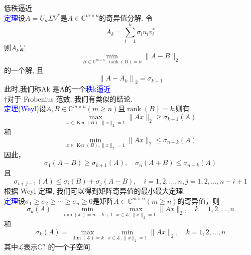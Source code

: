 \documentclass[12pt,a4paper]{article}
\begin{document}
低秩逼近\\

\textcolor{blue}{定理}设$A=U_{n} \Sigma V^{*}$是$A \in \mathbb{C}^{m \times n}$的奇异值分解. 令
$$
A_{k}=\sum_{i=1}^{k} \sigma_{i} u_{i} v_{i}^{*}
$$
则$A_{k}$是
\begin{equation}
\min _{B \in \mathbb{C}^{m \times n}, \operatorname{rank}(B)=k}\|A-B\|_{2}
\end{equation}
的一个解, 且
$$
\left\|A-A_{k}\right\|_{2}=\sigma_{k+1}
$$
此时,我们称Ak 是A的一个\textcolor{blue}{秩k逼近}\\
$\dagger$对于 Frobenius 范数, 我们有类似的结论.\\

\textcolor{blue}{定理(Weyl)}设$A, B \in \mathbb{C}^{m \times n}(m \geq n)$且$\operatorname{rank}(B)=k$,则有
\begin{equation}
\max _{x \in \operatorname{Ker}(B),\|x\|_{2}=1}\|A x\|_{2} \geq \sigma_{k+1}(A)
\end{equation}
和
\begin{equation}
\min _{x \in \operatorname{Ker}(B),\|x\|_{2}=1}\|A x\|_{2} \leq \sigma_{n-k}(A)
\end{equation}
因此，
\begin{equation}
\sigma_{1}(A-B) \geq \sigma_{k+1}(A), \quad \sigma_{n}(A+B) \leq \sigma_{n-k}(A)
\end{equation}
且
\begin{equation}
\sigma_{i+j-1}(A) \leq \sigma_{i}(B)+\sigma_{j}(A-B), \quad i=1,2, \ldots, n, j=1,2, \ldots, n-i+1
\end{equation}
根据 Weyl 定理, 我们可以得到矩阵奇异值的最小最大定理.\\

\textcolor{blue}{定理}设$\sigma_{1} \geq \sigma_{2} \geq \cdots \geq \sigma_{n} \geq 0$是矩阵$A \in \mathbb{C}^{m \times n}(m \geq n)$的奇异值，则
$$
\sigma_{k}(A)=\min _{\operatorname{dim}(\mathcal{L})=n-k+1} \max _{x \in \mathcal{L},\|x\|_{2}=1}\|A x\|_{2}, \quad k=1,2, \ldots, n
$$
和
$$
\sigma_{k}(A)=\max _{\operatorname{dim}(\mathcal{L})=k} \min _{x \in \mathcal{L},\|x\|_{2}=1}\|A x\|_{2}, \quad k=1,2, \ldots, n
$$
其中$\mathcal{L}$表示$\mathbb{C}^{n}$ 的一个子空间.\\
\end{document}
